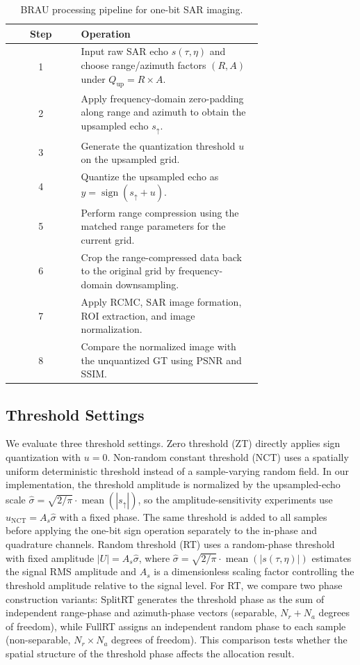 \documentclass[conference]{IEEEtran}
\begin{document}
\begin{table}[t]
\caption{BRAU processing pipeline for one-bit SAR imaging.}
\label{alg:brau}
\begin{center}
\scriptsize
\setlength{\tabcolsep}{3pt}
\begin{tabular}{c p{0.72\linewidth}}
\hline
Step & Operation \\
\hline
1 & Input raw SAR echo $s(\tau,\eta)$ and choose range/azimuth factors $(R,A)$ under $Q_{\mathrm{up}}=R\times A$. \\
2 & Apply frequency-domain zero-padding along range and azimuth to obtain the upsampled echo $s_{\uparrow}$. \\
3 & Generate the quantization threshold $u$ on the upsampled grid. \\
4 & Quantize the upsampled echo as $y=\operatorname{sign}(s_{\uparrow}+u)$. \\
5 & Perform range compression using the matched range parameters for the current grid. \\
6 & Crop the range-compressed data back to the original grid by frequency-domain downsampling. \\
7 & Apply RCMC, SAR image formation, ROI extraction, and image normalization. \\
8 & Compare the normalized image with the unquantized GT using PSNR and SSIM. \\
\hline
\end{tabular}
\end{center}
\end{table}

\subsection{Threshold Settings}

We evaluate three threshold settings. Zero threshold (ZT) directly applies sign quantization with $u=0$. Non-random constant threshold (NCT) uses a spatially uniform deterministic threshold instead of a sample-varying random field. In our implementation, the threshold amplitude is normalized by the upsampled-echo scale $\hat{\sigma}=\sqrt{2/\pi}\cdot\operatorname{mean}(|s_{\uparrow}|)$, so the amplitude-sensitivity experiments use $u_{\mathrm{NCT}}=A_s\hat{\sigma}$ with a fixed phase. The same threshold is added to all samples before applying the one-bit sign operation separately to the in-phase and quadrature channels. Random threshold (RT) uses a random-phase threshold with fixed amplitude $|U|=A_s\hat{\sigma}$, where $\hat{\sigma}= \sqrt{2/\pi}\cdot\operatorname{mean}(|s(\tau,\eta)|)$ estimates the signal RMS amplitude and $A_s$ is a dimensionless scaling factor controlling the threshold amplitude relative to the signal level. For RT, we compare two phase construction variants: SplitRT generates the threshold phase as the sum of independent range-phase and azimuth-phase vectors (separable, $N_r+N_a$ degrees of freedom), while FullRT assigns an independent random phase to each sample (non-separable, $N_r\times N_a$ degrees of freedom). This comparison tests whether the spatial structure of the threshold phase affects the allocation result.
\end{document}
